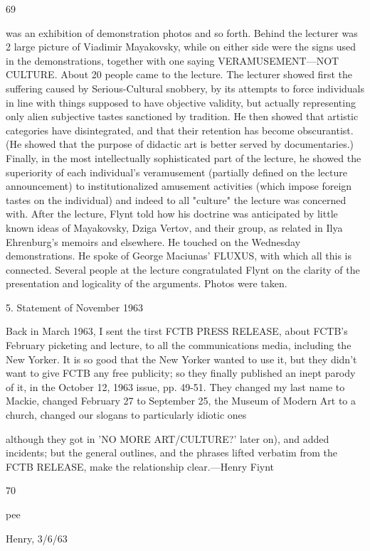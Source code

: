 \documentclass[10pt,twoside]{memoir}
\begin{document}
\begin{enumerate}
{{{{{{{{{{{{{{{69 


was an exhibition of demonstration photos and so forth. Behind the lecturer 
was 2 large picture of Viadimir Mayakovsky, while on either side were the 
signs used in the demonstrations, together with one saying 
VERAMUSEMENT---NOT CULTURE. About 20 people came to the lecture. 
The lecturer showed first the suffering caused by Serious-Cultural snobbery, 
by its attempts to force individuals in line with things supposed to have 
objective validity, but actually representing only alien subjective tastes 
sanctioned by tradition. He then showed that artistic categories have 
disintegrated, and that their retention has become obscurantist. (He showed 
that the purpose of didactic art is better served by documentaries.) Finally, 
in the most intellectually sophisticated part of the lecture, he showed the 
superiority of each individual's veramusement (partially defined on the 
lecture announcement) to institutionalized amusement activities (which 
impose foreign tastes on the individual) and indeed to all "culture" the 
lecture was concerned with. After the lecture, Flynt told how his doctrine 
was anticipated by little known ideas of Mayakovsky, Dziga Vertov, and 
their group, as related in Ilya Ehrenburg's memoirs and elsewhere. He 
touched on the Wednesday demonstrations. He spoke of George Maciunas' 
FLUXUS, with which all this is connected. Several people at the lecture 
congratulated Flynt on the clarity of the presentation and logicality of the 
arguments. Photos were taken. 


5. 
Statement of November 1963 


Back in March 1963, I sent the tirst FCTB PRESS RELEASE, about FCTB's 
February picketing and lecture, to all the communications media, including 
the New Yorker. It is so good that the New Yorker wanted to use it, but 
they didn't want to give FCTB any free publicity; so they finally published 
an inept parody of it, in the October 12, 1963 issue, pp. 49-51. They 
changed my last name to Mackie, changed February 27 to September 25, the 
Museum of Modern Art to a church, changed our slogans to particularly 
idiotic ones {although they got in 'NO MORE ART/CULTURE?' later on), 
and added incidents; but the general outlines, and the phrases lifted verbatim 
from the FCTB RELEASE, make the relationship clear.---Henry Fiynt 


70 


pee 


Henry, 3/6/63 


}}}}}}}}}}}}}}}}
\end{enumerate}
\end{document}
